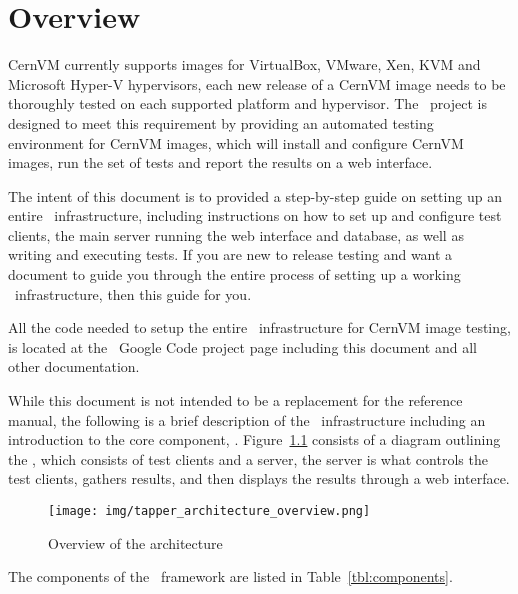 \chapter{Overview}
\label{sct:overview}

CernVM currently supports images for VirtualBox, VMware, Xen, KVM and Microsoft Hyper-V hypervisors, each new release of a CernVM image needs to be 
thoroughly tested on each supported platform and hypervisor. The \cernvmreleasetesting\ project is designed to meet this requirement by providing an 
automated testing environment for CernVM images, which will install and configure CernVM images, run the set of tests and report the results on a web
interface.

The intent of this document is to provided a step-by-step guide on setting up an entire \cernvmreleasetesting\ infrastructure, including instructions
on how to set up and configure test clients, the main server running the web interface and database, as well as writing and executing tests. If you are
new to release testing and want a document to guide you through the entire process of setting up a working \cernvmreleasetesting\ infrastructure,
then this guide for you.

All the code needed to setup the entire \releasetesting\ infrastructure for CernVM image testing, is located at the \cernvmreleasetesting\ Google Code project
page\cite{GCreleasetesting} including this document and all other documentation. 

While this document is not intended to be a replacement for the reference manual, the following is a brief description of the \releasetesting\ infrastructure 
including an introduction to the core component, \amdtapper\cite{tapper}. Figure~\ref{fig:architecture} consists of a diagram outlining the
, which consists of test clients and a server, the server is what controls the test clients, gathers 
results, and then displays the results through a web interface.\newline

\begin{figure}[!hbp]
	\begin{center}
		\texttt{[image: img/tapper\_architecture\_overview.png]}
	\end{center}
	\caption{Overview of the \tapper architecture}
	\label{fig:architecture}
\end{figure}

The components of the \releasetesting~framework are listed in Table~\ref{tbl:components}. 

